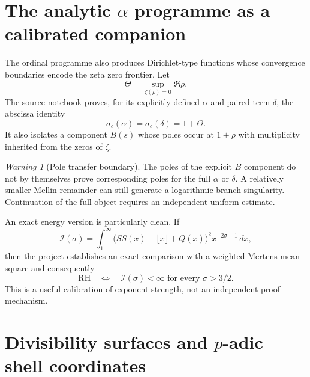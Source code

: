 \documentclass[11pt]{amsart}
\numberwithin{equation}{section}
\theoremstyle{plain}
\theoremstyle{definition}
\theoremstyle{remark}
\newtheorem{warning}[theorem]{Warning}
\newcommand{\Sq}{Q}
\begin{document}
\section{The analytic \texorpdfstring{$\alpha$}{alpha} programme as a calibrated companion}
\label{sec:alpha-programme}

The ordinal programme also produces Dirichlet-type functions whose convergence boundaries encode the zeta zero frontier.  Let
\begin{equation}
\Theta=\sup_{\zeta(\rho)=0}\Re\rho.
\label{eq:theta-zero-frontier}
\end{equation}
The source notebook proves, for its explicitly defined $\alpha$ and paired term $\delta$, the abscissa identity
\begin{equation}
\sigma_c(\alpha)=\sigma_c(\delta)=1+\Theta.
\label{eq:alpha-abscissa}
\end{equation}
It also isolates a component $B(s)$ whose poles occur at $1+\rho$ with multiplicity inherited from the zeros of $\zeta$.

\begin{warning}[Pole transfer boundary]
\label{warn:alpha-poles}
The poles of the explicit $B$ component do not by themselves prove corresponding poles for the full $\alpha$ or $\delta$.
A relatively smaller Mellin remainder can still generate a logarithmic branch singularity.  Continuation of the full object requires
an independent uniform estimate.
\end{warning}

An exact energy version is particularly clean.  If
\begin{equation}
\mathcal I(\sigma)
=
\int_1^\infty
\bigl(SS(x)-\lfloor x\rfloor+\Sq(x)\bigr)^2
x^{-2\sigma-1}\,dx,
\label{eq:alpha-energy}
\end{equation}
then the project establishes an exact comparison with a weighted Mertens mean square and consequently
\begin{equation}
\mathrm{RH}
\quad\Longleftrightarrow\quad
\mathcal I(\sigma)<\infty
\text{ for every }\sigma>3/2.
\label{eq:alpha-energy-rh}
\end{equation}
This is a useful calibration of exponent strength, not an independent proof mechanism.

\section{Divisibility surfaces and \texorpdfstring{$p$-adic}{p-adic} shell coordinates}
\label{sec:surface-padic}
\end{document}

